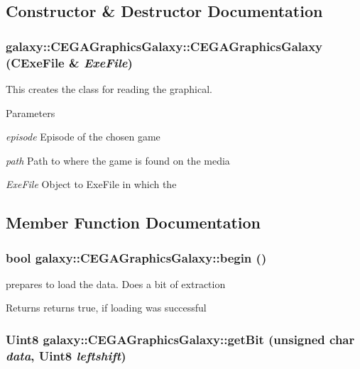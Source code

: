 \subsection{Constructor \& Destructor Documentation}
\hypertarget{classgalaxy_1_1_c_e_g_a_graphics_galaxy_a76b6bfdad3e6a79bd32a8d588b138bde}{
\subsubsection[{CEGAGraphicsGalaxy}]{\setlength{\rightskip}{0pt plus 5cm}galaxy::CEGAGraphicsGalaxy::CEGAGraphicsGalaxy ({\bf CExeFile} \& {\em ExeFile})}}
\label{classgalaxy_1_1_c_e_g_a_graphics_galaxy_a76b6bfdad3e6a79bd32a8d588b138bde}


This creates the class for reading the graphical. 


\begin{DoxyParams}{Parameters}
\item[{\em episode}]Episode of the chosen game \item[{\em path}]Path to where the game is found on the media \item[{\em ExeFile}]Object to ExeFile in which the \end{DoxyParams}


\subsection{Member Function Documentation}
\hypertarget{classgalaxy_1_1_c_e_g_a_graphics_galaxy_a11844830e253d16d1cee988786314f9b}{
\subsubsection[{begin}]{\setlength{\rightskip}{0pt plus 5cm}bool galaxy::CEGAGraphicsGalaxy::begin ()}}
\label{classgalaxy_1_1_c_e_g_a_graphics_galaxy_a11844830e253d16d1cee988786314f9b}


prepares to load the data. Does a bit of extraction 

\begin{DoxyReturn}{Returns}
returns true, if loading was successful 
\end{DoxyReturn}
\hypertarget{classgalaxy_1_1_c_e_g_a_graphics_galaxy_a1f7e385c838fc18ab44d9fb4e2897892}{
\subsubsection[{getBit}]{\setlength{\rightskip}{0pt plus 5cm}Uint8 galaxy::CEGAGraphicsGalaxy::getBit (unsigned char {\em data}, \/  Uint8 {\em leftshift})}}
\label{classgalaxy_1_1_c_e_g_a_graphics_galaxy_a1f7e385c838fc18ab44d9fb4e2897892}


